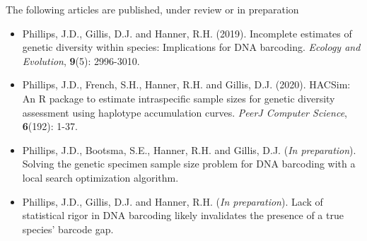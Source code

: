 \vspace{5mm}

The following articles are published, under review or in preparation

\begin{itemize}

\item Phillips, J.D., Gillis, D.J. and Hanner, R.H. (2019). Incomplete estimates of genetic diversity within species: Implications for DNA barcoding. \textit{Ecology and Evolution}, \textbf{9}(5): 2996-3010. 

\vspace{1mm}

\item Phillips, J.D., French, S.H., Hanner, R.H. and Gillis, D.J. (2020). HACSim: An R package to estimate intraspecific sample sizes for genetic diversity assessment using haplotype accumulation curves. \textit{PeerJ Computer Science}, \textbf{6}(192): 1-37.

\vspace{1mm}

\item Phillips, J.D., Bootsma, S.E., Hanner, R.H. and Gillis, D.J. (\textit{In preparation}). \\ Solving the genetic specimen sample size problem for DNA barcoding with a local search optimization algorithm.

\vspace{1mm}

\item Phillips, J.D., Gillis, D.J. and Hanner, R.H. (\textit{In preparation}). Lack of statistical rigor in DNA barcoding likely invalidates the presence of a true species' barcode gap.

\end{itemize} 